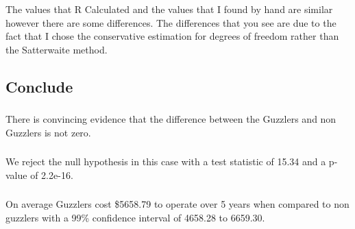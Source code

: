 \documentclass[letterpaper, onecolumn,10pt]{IEEEtran}
\begin{document}
                    The values that R Calculated and the values that I found by hand are similar however there are some differences. The differences that you see are due to the fact that I chose the conservative estimation for degrees of freedom rather than the Satterwaite method.\\
            
            \subsection{Conclude}
                \subsubsection{}
                There is convincing evidence that the difference between the Guzzlers and non Guzzlers is not zero.\\
                
                \subsubsection{}
		        We reject the null hypothesis in this case with a test statistic of 15.34 and a p-value of 2.2e-16.
		        
		        \subsubsection{}
		        On average Guzzlers cost \$5658.79 to operate over 5 years when compared to non guzzlers with a 99\% confidence interval of 4658.28 to 6659.30.\\ 
		
\end{document}
